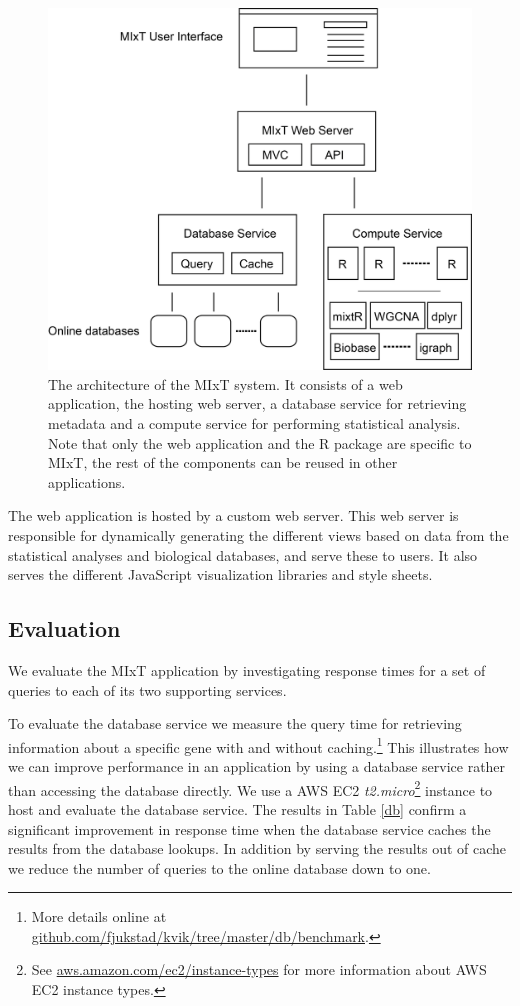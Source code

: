 \begin{figure}[h!]
\centering
\includegraphics[scale=0.4]{figures/mixt-architecture.png}
\caption{The architecture of the MIxT system. It consists of
a web application, the hosting web server, a database service for retrieving
metadata and a compute service for performing statistical analysis. Note that
only the web application and the R package are specific to MIxT, the rest of the
components can be reused in other applications.} 
\label{kvik-mixt}
\end{figure} 

The web application is hosted by a custom web server. This web server is
responsible for dynamically generating the different views based on data from
the statistical analyses and biological databases, and serve these to users. It
also serves the different JavaScript visualization libraries and style sheets. 

\subsection{Evaluation} 
We evaluate the MIxT application by investigating response times for a set of
queries to each of its two supporting services. 

To evaluate the database service we measure the query time for retrieving
information about a specific gene with and without caching.\footnote{More
details online at \url{github.com/fjukstad/kvik/tree/master/db/benchmark}.} This
illustrates how we can improve performance in an application by using a database
service rather than accessing the database directly. 
We use a AWS EC2 \emph{t2.micro}\footnote{See
\url{aws.amazon.com/ec2/instance-types} for more information about AWS EC2
instance types.} instance to host and evaluate the database service.  The
results in Table \ref{db} confirm a significant improvement in response time
when the database service caches the results from the database lookups. In
addition by serving the results out of cache we reduce the number of queries to
the online database down to one. 

